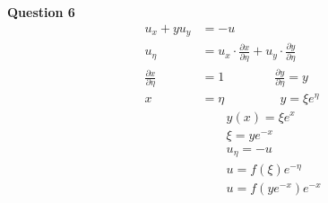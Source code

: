 \documentclass[12pt, letterpaper]{article}
\begin{document}
\noindent \textbf{Question 6}
\begin{align*}
    u_x + yu_y &= -u \\
    u_\eta &= u_x \cdot \frac{\partial x}{\partial \eta} + u_y \cdot \frac{\partial y}{\partial \eta} \\
    \frac{\partial x}{\partial \eta} &= 1 \qquad \qquad \frac{\partial y}{\partial \eta} = y \\
    x &= \eta \qquad \qquad\ \ y = \xi e^\eta \\
    &\qquad y(x) = \xi e^x \\
    &\qquad \xi = ye^{-x} \\
    &\qquad u_\eta = -u \\
    &\qquad u = f(\xi)e^{-\eta} \\
    &\qquad u = f(ye^{-x})e^{-x}
\end{align*}
\end{document}
